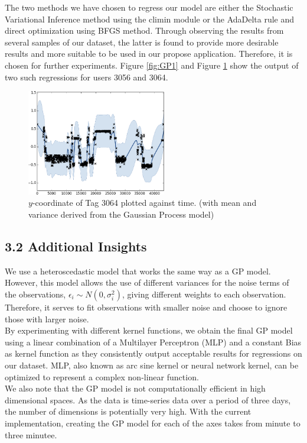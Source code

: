 \documentclass[letterpaper]{article}
\begin{document}
The two methods we have chosen to regress our model are either the Stochastic Variational Inference method using the climin module or the AdaDelta rule and direct optimization using BFGS method. Through observing the results from several samples of our dataset, the latter is found to provide more desirable results and more suitable to be used in our propose application. Therefore, it is chosen for further experiments. Figure \ref{fig:GP1} and Figure \ref{fig:GP2} show the output of two such regressions for users 3056 and 3064.

\begin{figure}[h!]
  \centering
    \includegraphics[width=230px,natwidth=665,natheight=391]{selected_GP/3064.csv_Y.png}
  \caption{$y$-coordinate of Tag 3064 plotted against time. (with mean and variance derived from the Gaussian Process model)}
  \label{fig:GP2}
\end{figure}

\subsection{3.2  Additional Insights}

We use a heteroscedastic model that works the same way as a GP model. However, this model allows the use of different variances for the noise terms of the observations, $\epsilon_i \sim N(0, \sigma_i^2)$, giving different weights to each observation. Therefore, it serves to fit observations with smaller noise and choose to ignore those with larger noise. \\

By experimenting with different kernel functions, we obtain the final GP model using a linear combination of a Multilayer Perceptron (MLP) and a constant Bias as kernel function as they consistently output acceptable results for regressions on our dataset. MLP, also known as arc sine kernel or neural network kernel, can be optimized to represent a complex non-linear function. \\

We also note that the GP model is not computationally efficient in high dimensional spaces. As the data is time-series data over a period of three days, the number of dimensions is potentially very high. With the current implementation, creating the GP model for each of the axes takes from minute to three minutee. \\
\end{document}
